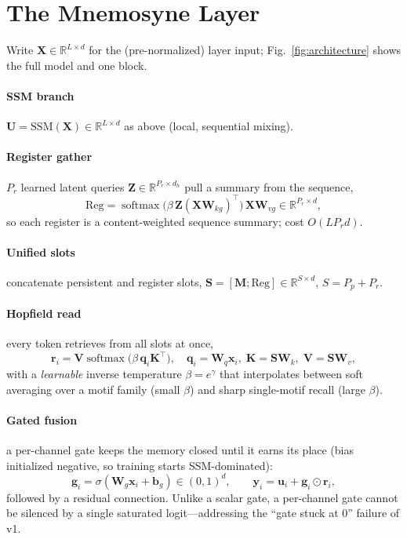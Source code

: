 \documentclass[10pt,journal]{IEEEtran}
\newcommand{\R}{\mathbb{R}}
\newcommand{\softmax}{\operatorname{softmax}}
\begin{document}
\section{The Mnemosyne Layer}
\label{sec:method}
Write $\bm X\in\R^{L\times d}$ for the (pre-normalized) layer input;
Fig.~\ref{fig:architecture} shows the full model and one block.

\paragraph{SSM branch} $\bm U=\mathrm{SSM}(\bm X)\in\R^{L\times d}$ as above
(local, sequential mixing).

\paragraph{Register gather} $P_r$ learned latent queries $\bm Z\in\R^{P_r\times d_h}$
pull a summary from the sequence,
\begin{equation}
\mathrm{Reg}=\softmax\!\big(\beta\,\bm Z(\bm X\bm W_{kg})^\top\big)\,\bm X\bm W_{vg}
\in\R^{P_r\times d},
\end{equation}
so each register is a content-weighted sequence summary; cost $O(LP_rd)$.

\paragraph{Unified slots} concatenate persistent and register slots,
$\bm S=[\bm M;\mathrm{Reg}]\in\R^{S\times d}$, $S=P_p+P_r$.

\paragraph{Hopfield read} every token retrieves from all slots at once,
\begin{equation}
\bm r_i=\bm V\softmax\!\Big(\beta\,\bm q_i\bm K^\top\Big),\quad
\bm q_i=\bm W_q\bm x_i,\;\bm K=\bm S\bm W_k,\;\bm V=\bm S\bm W_v,
\label{eq:read}
\end{equation}
with a \emph{learnable} inverse temperature $\beta=e^{\gamma}$ that interpolates
between soft averaging over a motif family (small $\beta$) and sharp single-motif
recall (large $\beta$).

\paragraph{Gated fusion} a per-channel gate keeps the memory closed until it
earns its place (bias initialized negative, so training starts SSM-dominated):
\begin{equation}
\bm g_i=\sigma(\bm W_g\bm x_i+\bm b_g)\in(0,1)^d,\qquad
\bm y_i=\bm u_i+\bm g_i\odot\bm r_i,
\end{equation}
followed by a residual connection. Unlike a scalar gate, a per-channel gate
cannot be silenced by a single saturated logit---addressing the ``gate stuck at
0'' failure of v1.
\end{document}
